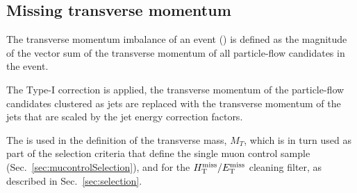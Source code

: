 \subsection{Missing transverse momentum}

The transverse momentum imbalance of an event (\met) is defined as the
magnitude of the vector sum of the transverse momentum of all
particle-flow candidates in the event.

The Type-I \met correction \cite{Khachatryan:2014gga} is applied, \ie
the transverse momentum of the particle-flow candidates clustered as
jets are replaced with the transverse momentum of the jets that are
scaled by the jet energy correction factors.

The \met is used in the definition of the transverse mass, $M_{T}$,
which is in turn used as part of the selection criteria that define
the single muon control sample (Sec.~\ref{sec:mucontrolSelection}),
and for the $\mbox{$\mbox{$H_{\rm T}^{\rm miss}$} / \mbox{$E_\text{T}^{\rm miss}$}$}$ cleaning filter, as described in
Sec.~\ref{sec:selection}.

